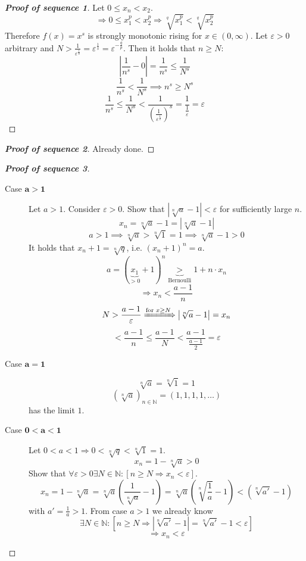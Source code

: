 \documentclass[a4paper,landscape,twocolumn]{article}
\newcommand\abs[1]{\left|#1\right|}
\begin{document}
\begin{proof}[\textbf{Proof of sequence 1}]
  Let $0 \leq x_n < x_2$.
  \[ \Rightarrow 0 \leq x_1^p < x_2^p \Rightarrow \sqrt[q]{x_1^p} < \sqrt[q]{x_2^p} \]
  Therefore $f(x) = x^s$ is strongly monotonic rising for $x \in (0, \infty)$.
  Let $\varepsilon > 0$ arbitrary and $N > \frac1{\varepsilon^{\frac1s}} = \varepsilon^{\frac1s} = \varepsilon^{-\frac qp}$.
  Then it holds that $n \geq N$:
  \[ \abs{\frac1{n^s} - 0} = \frac{1}{n^s} \leq \frac{1}{N^s} \]
  \[ \frac{1}{n^s} < \frac{1}{N^s} \implies n^s \geq N^s \]
  \[
      \frac{1}{n^s} \leq \frac{1}{N^s} < \frac{1}{\left(\frac{1}{\varepsilon^{\frac1s}}\right)^s}
      = \frac{1}{\frac1\varepsilon}
      = \varepsilon
  \]
\end{proof}

\begin{proof}[\textbf{Proof of sequence 2}]
  Already done.
\end{proof}

\begin{proof}[\textbf{Proof of sequence 3}]
  \begin{description}
    \item[Case $\mathbf{a > 1}$]
      Let $a > 1$. Consider $\varepsilon > 0$.
      Show that $\abs{\sqrt[n]{a} - 1} < \varepsilon$ for sufficiently large $n$.
      \[ x_n = \sqrt[n]{a} - 1 = \abs{\sqrt[n]{a} - 1} \]
      \[ a > 1 \implies \sqrt[n]{a} > \sqrt[n]{1} = 1 \implies \sqrt[n]{a} - 1 > 0 \]
      It holds that $x_n + 1 = \sqrt[n]{q}$, i.e. $(x_n + 1)^n = a$.
      \[ a = (\underbrace{x_1}_{> 0} + 1)^n \underbrace{>}_{\text{Bernoulli}} 1 + n \cdot x_n \]
      \[ \Rightarrow x_n < \frac{a - 1}{n} \]
      \[ N > \frac{a - 1}{\varepsilon} \xRightarrow{\text{for } x \geq N} \abs{\sqrt[n]{a} - 1} = x_n \]
      \[ < \frac{a - 1}{n} \leq \frac{a - 1}{N} < \frac{a - 1}{\frac{a - 1}{2}} = \varepsilon \]
    \item[Case $\mathbf{a = 1}$]
      \[ \sqrt[n]{a} = \sqrt[n]{1} = 1 \]
      \[ \left(\sqrt[n]{a}\right)_{n \in \mathbb N} = (1, 1, 1, 1, \dots) \]
      has the limit $1$.
    \item[Case $\mathbf{0 < a < 1}$]
      Let $0 < a < 1 \Rightarrow 0 < \sqrt[n]{q} < \sqrt[n]{1} = 1$.
      \[ x_n = 1 - \sqrt[n]{a} > 0 \]
      Show that $\forall \varepsilon > 0 \exists N \in \mathbb N: \left[n \geq N \Rightarrow x_n < \varepsilon\right]$.
      \[
          x_n
          = 1 - \sqrt[n]{a} = \sqrt[n]{a} \left(\frac{1}{\sqrt[n]{a}} - 1\right)
          = \sqrt[n]{a} \left(\sqrt[n]{\frac1a} - 1\right) < \left(\sqrt[n]{a'} - 1\right)
      \]
      with $a' = \frac1a > 1$.
      From case $a > 1$ we already know
      \[ \exists N \in \mathbb N: \left[n \geq N \Rightarrow \abs{\sqrt[n]{a'} - 1} = \sqrt[n]{a'} - 1 < \varepsilon\right] \]
      \[ \Rightarrow x_n < \varepsilon \]
  \end{description}
\end{proof}
\end{document}
